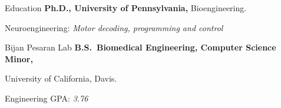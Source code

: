 \begin{rubric}{Education}
\entry*[2023 -- 2028 expected]%
	\textbf{Ph.D., University of Pennsylvania,} Bioengineering.\par 
	Neuroengineering: \emph{Motor decoding, programming and control}

	Bijan Pesaran Lab
%
\entry*[2018 -- 2022]%
	\textbf{B.S.~Biomedical Engineering, Computer Science Minor,} 
	
	University of California, Davis.\par 
	Engineering GPA: \emph{3.76}
% 
\end{rubric}
